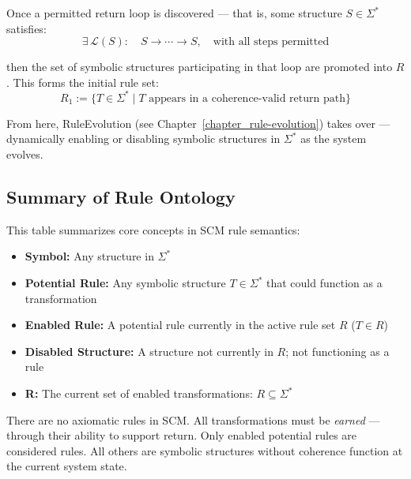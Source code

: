 \begin{definition} \label{def:rule-emergence}
Once a permitted return loop is discovered — that is, some structure $S \in \Sigma^*$ satisfies:
\begin{equation} \label{eq:return-loop-condition}
\exists\, \mathcal{L}(S):\quad S \rightarrow \cdots \rightarrow S, \quad \text{with all steps permitted}
\end{equation}

then the set of symbolic structures participating in that loop are promoted into $R$.  
This forms the initial rule set:
\begin{equation} \label{eq:r1-definition}
R_1 := \{ T \in \Sigma^* \mid T \text{ appears in a coherence-valid return path} \}
\end{equation}

From here, RuleEvolution (see Chapter~\ref{chapter_rule-evolution}) takes over — dynamically enabling or disabling symbolic structures in $\Sigma^*$ as the system evolves.
\end{definition}

\subsection{Summary of Rule Ontology} \label{summary-of-rule-ontology}

This table summarizes core concepts in SCM rule semantics:

\begin{itemize}
  \item \textbf{Symbol:} Any structure in $\Sigma^*$
  \item \textbf{Potential Rule:} Any symbolic structure $T \in \Sigma^*$ that could function as a transformation
  \item \textbf{Enabled Rule:} A potential rule currently in the active rule set $R$ ($T \in R$)
  \item \textbf{Disabled Structure:} A structure not currently in $R$; not functioning as a rule
  \item \textbf{R:} The current set of enabled transformations: $R \subseteq \Sigma^*$
\end{itemize}

There are no axiomatic rules in SCM. All transformations must be \textit{earned} — through their ability to support return.  
Only enabled potential rules are considered rules. All others are symbolic structures without coherence function at the current system state.

